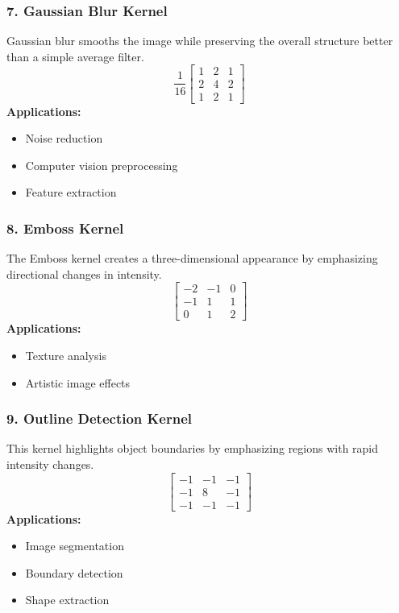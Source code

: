\documentclass[11pt]{article}
\begin{document}
\subsubsection*{7. Gaussian Blur Kernel}
Gaussian blur smooths the image while preserving the overall structure better than a simple average filter. 
$$ \frac{1}{16} \begin{bmatrix} 1 & 2 & 1 \\ 2 & 4 & 2 \\ 1 & 2 & 1 \end{bmatrix} $$
\textbf{Applications:}
\begin{itemize}
    \item Noise reduction 
    \item Computer vision preprocessing 
    \item Feature extraction 
\end{itemize}

\subsubsection*{8. Emboss Kernel}
The Emboss kernel creates a three-dimensional appearance by emphasizing directional changes in intensity. 
$$ \begin{bmatrix} -2 & -1 & 0 \\ -1 & 1 & 1 \\ 0 & 1 & 2 \end{bmatrix} $$
\textbf{Applications:}
\begin{itemize}
    \item Texture analysis 
    \item Artistic image effects 
\end{itemize}

\subsubsection*{9. Outline Detection Kernel}
This kernel highlights object boundaries by emphasizing regions with rapid intensity changes. 
$$ \begin{bmatrix} -1 & -1 & -1 \\ -1 & 8 & -1 \\ -1 & -1 & -1 \end{bmatrix} $$
\textbf{Applications:}
\begin{itemize}
    \item Image segmentation 
    \item Boundary detection 
    \item Shape extraction 
\end{itemize}
\end{document}
